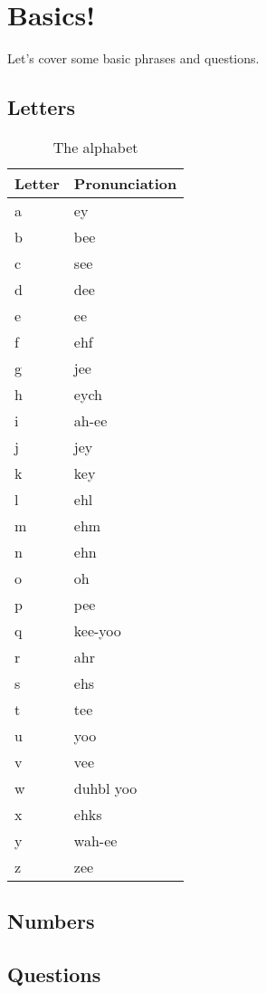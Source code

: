 \chapter{Basics!}

Let's cover some basic phrases and questions.

\section{Letters}

\begin{table}[H]
	\centering
	\begin{tabular}{ll}
	\toprule
	\textbf{Letter} & \textbf{Pronunciation} \\
	\midrule
	a & ey \\
	b & bee \\
	c & see \\
	d & dee \\
	e & ee \\
	f & ehf \\
	g & jee \\
	h & eych \\
	i & ah-ee \\
	j & jey \\
	k & key \\
	l & ehl \\
	m & ehm \\
	n & ehn \\
	o & oh \\
	p & pee \\
	q & kee-yoo \\
	r & ahr \\
	s & ehs \\
	t & tee \\
	u & yoo \\
	v & vee \\
	w & duhbl yoo \\
	x & ehks \\
	y & wah-ee \\
	z & zee \\
	\bottomrule
	\end{tabular}
	\caption{The alphabet}
\end{table}

\section{Numbers}

\section{Questions}


